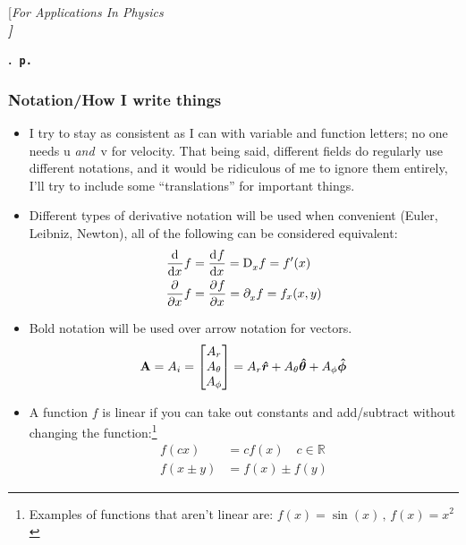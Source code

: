 [\sl For Applications In Physics  \\ \small \bf \UM]
\author{\EC}
\date{\today}
\fancyhf{}
\fancyhead[LO,RE]{\small\sl\leftmark}
\setlength\headheight{17pt}

\maketitle
\begingroup
    \parindent 0cm \parfillskip 0cm \leftskip 0cm \rightskip 0cm
    \etocframedstyle[1]{}
                  {}
                  {} {\Large\bf\etocnumber.~\etocname\hfill\nobreak\tt p.~\makebox[12 pt][r]{\etocpage}\par}
                  {\vspace{-0.25cm}}
    \tableofcontents\label{toc:FirstPage}
\endgroup
\newpage
\subsubsection*{Notation/How I write things}  
    \begin{itemize}
    \item I try to stay as consistent as I can with variable and function letters; no one needs u {\sl and\/}~v for velocity. That being said, different fields do regularly use different notations, and it would be ridiculous of me to ignore them entirely, I'll try to include some ``translations'' for important things.
    \item
    Different types of derivative notation will be used when convenient (Euler, Leibniz, Newton), all of the following can be considered equivalent: 
    \begin{align*}
        \der{x}f&=\der{f}{x}=\der*{x}f=f'(x)
        \\
        \pder{x}f&=\pder{f}{x}=\pder*{x}f=f_x(x,y)
    \end{align*}
    \item Bold notation will be used over arrow notation for vectors.  
    \begin{equation*}
        \vb{A}= A_i=
        \begin{bmatrix}
        A_r
        \\
        A_\theta
        \\
        A_\phi
        \end{bmatrix} =A_r\e{r}+A_\theta\e{\theta}+A_\phi\e{\phi}
    \end{equation*}   
    \item A function $f$ is linear if you can take out constants and add/subtract without changing the function:\footnote{Examples of functions that aren't linear are: \(f(x)=\sin(x)\,,\,f(x)= x^2\)}
    \begin{align*}
        f(cx)&=cf(x)\quad c\in \mathbb{R}
        \\
        f(x\pm y)&=f(x)\pm f(y)
    \end{align*}
    \end{itemize}
\newpage{} %
\endinput